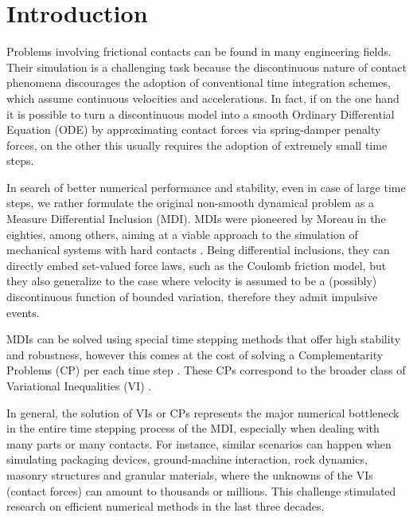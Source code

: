 \documentclass[AMA,STIX1COL]{WileyNJD-v2}
\begin{document}
\maketitle              %



\section{Introduction}

Problems involving frictional contacts can be found in many engineering fields. Their simulation is a challenging task because the discontinuous nature of contact phenomena discourages the adoption of conventional time integration schemes, which assume continuous velocities and accelerations. In fact, if on the one hand it is possible to turn a discontinuous model into a smooth Ordinary Differential Equation (ODE) by approximating contact forces via spring-damper penalty forces, on the other this usually requires the adoption of extremely small time steps. 

In search of better numerical performance and stability, even in case of large time steps, we rather formulate the original non-smooth dynamical problem as a Measure Differential Inclusion (MDI). MDIs were pioneered by Moreau in the eighties, among others, aiming at a viable approach to the simulation of mechanical systems with hard contacts
\cite{Moreau1983,moreau1988topics}. 
Being differential inclusions, they can directly embed set-valued force laws, such as the Coulomb friction model, but they also generalize to the case where velocity is assumed to be a (possibly) discontinuous function of bounded variation, therefore they admit impulsive events.

MDIs can be solved using special time stepping methods that offer high stability and robustness, however this comes at the cost of solving a Complementarity Problems (CP) per each time step \cite{acary2008numerical}. These CPs correspond to the broader class of Variational Inequalities (VI) \cite{Kinderleher1980,Harker1990}.

In general, the solution of VIs or CPs represents the major numerical bottleneck in the entire time stepping process of the MDI, especially when dealing with many parts or many contacts. For instance, similar scenarios can happen when simulating packaging devices, ground-machine interaction, rock dynamics, masonry structures and granular materials, where the unknowns of the VIs (contact forces) can amount to thousands or millions. This challenge stimulated research on efficient numerical methods in the last three decades. 
\end{document}
